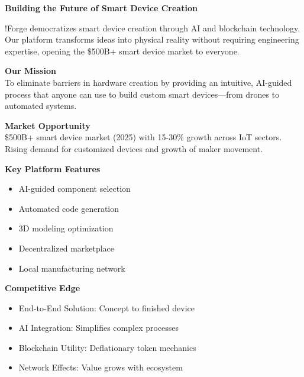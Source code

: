 \vspace{0.3cm}
\begin{center}
\textcolor{fabPrimary}{\Large\textbf{Building the Future of Smart Device Creation}}
\end{center}

\vspace{0.2cm}
\noindent !Forge democratizes smart device creation through AI and blockchain technology. Our platform transforms ideas into physical reality without requiring engineering expertise, opening the \$500B+ smart device market to everyone.

\vspace{0.2cm}
\begin{multicols}{2}
\textcolor{fabPrimary}{\textbf{Our Mission}}\\
\noindent To eliminate barriers in hardware creation by providing an intuitive, AI-guided process that anyone can use to build custom smart devices—from drones to automated systems.

\columnbreak

\textcolor{fabPrimary}{\textbf{Market Opportunity}}\\
\noindent \$500B+ smart device market (2025) with 15-30\% growth across IoT sectors. Rising demand for customized devices and growth of maker movement.
\end{multicols}

\vspace{0.2cm}
\begin{multicols}{2}
\textcolor{fabSecondary}{\textbf{Key Platform Features}}
\vspace{0.05cm}
\begin{itemize}[leftmargin=*, topsep=0pt, itemsep=0pt]
    \item AI-guided component selection
    \item Automated code generation
    \item 3D modeling optimization
    \item Decentralized marketplace
    \item Local manufacturing network
\end{itemize}

\columnbreak

\textcolor{fabAccent}{\textbf{Competitive Edge}}
\vspace{0.05cm}
\begin{itemize}[leftmargin=*, topsep=0pt, itemsep=0pt]
    \item End-to-End Solution: Concept to finished device
    \item AI Integration: Simplifies complex processes
    \item Blockchain Utility: Deflationary token mechanics
    \item Network Effects: Value grows with ecosystem
\end{itemize}
\end{multicols}

